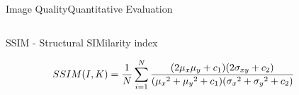 \documentclass[10pt, unicode]{beamer}
\begin{document}
\begin{frame}{Image Quality}{Quantitative Evaluation}
\begin{columns}
\begin{column}{0.6\textwidth}
\begin{alertblock}{SSIM - Structural SIMilarity index}
\begin{itemize}
          \begin{equation*}
          \hspace{-0.75cm}
          SSIM(I, K) = \frac{1}{N}\sum_{i=1}^{N} \frac{(2\mu_x\mu_y + c_1)(2\sigma_{xy} + c_2)}{ ({\mu_x}^2 + {\mu_y}^2 + c_1)({\sigma_x}^2 + {\sigma_y}^2 + c_2) }
          \end{equation*}
          \vspace{.4cm}
        \end{itemize}
      \end{alertblock}

    \end{column}

  \end{columns}

\end{frame}
\end{document}
